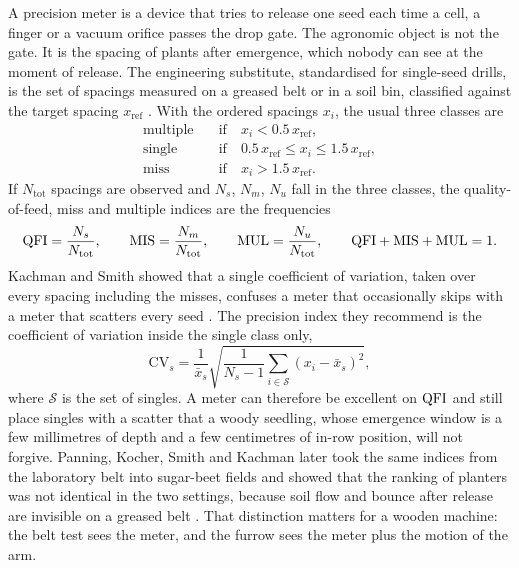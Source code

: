 A precision meter is a device that tries to release one seed each time a cell, a finger or a vacuum orifice passes the drop gate. The agronomic object is not the gate. It is the spacing of plants after emergence, which nobody can see at the moment of release. The engineering substitute, standardised for single-seed drills, is the set of spacings measured on a greased belt or in a soil bin, classified against the target spacing \(x_{\mathrm{ref}}\) \cite{iso7256,kachman1995}. With the ordered spacings \(x_i\), the usual three classes are
\begin{equation}
\label{eq:classes}
\begin{aligned}
\text{multiple} &\quad\text{if}\quad x_i < 0.5\, x_{\mathrm{ref}},\\
\text{single} &\quad\text{if}\quad 0.5\, x_{\mathrm{ref}} \le x_i \le 1.5\, x_{\mathrm{ref}},\\
\text{miss} &\quad\text{if}\quad x_i > 1.5\, x_{\mathrm{ref}}.
\end{aligned}
\end{equation}
If \(N_{\mathrm{tot}}\) spacings are observed and \(N_s\), \(N_m\), \(N_u\) fall in the three classes, the quality-of-feed, miss and multiple indices are the frequencies
\begin{equation}
\label{eq:qfi}
\mathrm{QFI} = \frac{N_s}{N_{\mathrm{tot}}},\qquad
\mathrm{MIS} = \frac{N_m}{N_{\mathrm{tot}}},\qquad
\mathrm{MUL} = \frac{N_u}{N_{\mathrm{tot}}},\qquad
\mathrm{QFI} + \mathrm{MIS} + \mathrm{MUL} = 1.
\end{equation}
Kachman and Smith showed that a single coefficient of variation, taken over every spacing including the misses, confuses a meter that occasionally skips with a meter that scatters every seed \cite{kachman1995}. The precision index they recommend is the coefficient of variation inside the single class only,
\begin{equation}
\label{eq:cv}
\mathrm{CV}_s = \frac{1}{\bar{x}_s}\sqrt{\frac{1}{N_s-1}\sum_{i\in\mathcal{S}}(x_i-\bar{x}_s)^2},
\end{equation}
where \(\mathcal{S}\) is the set of singles. A meter can therefore be excellent on \(\mathrm{QFI}\) and still place singles with a scatter that a woody seedling, whose emergence window is a few millimetres of depth and a few centimetres of in-row position, will not forgive. Panning, Kocher, Smith and Kachman later took the same indices from the laboratory belt into sugar-beet fields and showed that the ranking of planters was not identical in the two settings, because soil flow and bounce after release are invisible on a greased belt \cite{panning2000}. That distinction matters for a wooden machine: the belt test sees the meter, and the furrow sees the meter plus the motion of the arm.

